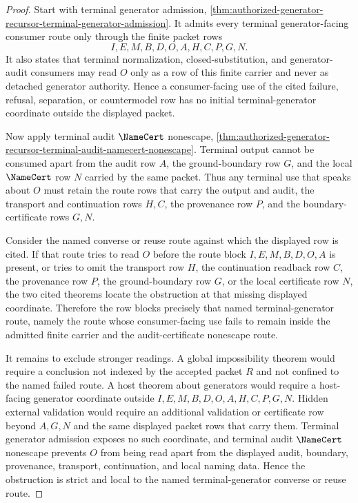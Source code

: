 \begin{proof}
Start with terminal generator admission, \autoref{thm:authorized-generator-recursor-terminal-generator-admission}. It admits every terminal generator-facing consumer route only through the finite packet rows
$$
I,E,M,B,D,O,A,H,C,P,G,N.
$$
It also states that terminal normalization, closed-substitution, and generator-audit consumers may read $O$ only as a row of this finite carrier and never as detached generator authority. Hence a consumer-facing use of the cited failure, refusal, separation, or countermodel row has no initial terminal-generator coordinate outside the displayed packet.

Now apply terminal audit $\NameCert$ nonescape, \autoref{thm:authorized-generator-recursor-terminal-audit-namecert-nonescape}. Terminal output cannot be consumed apart from the audit row $A$, the ground-boundary row $G$, and the local $\NameCert$ row $N$ carried by the same packet. Thus any terminal use that speaks about $O$ must retain the route rows that carry the output and audit, the transport and continuation rows $H,C$, the provenance row $P$, and the boundary-certificate rows $G,N$.

Consider the named converse or reuse route against which the displayed row is cited. If that route tries to read $O$ before the route block $I,E,M,B,D,O,A$ is present, or tries to omit the transport row $H$, the continuation readback row $C$, the provenance row $P$, the ground-boundary row $G$, or the local certificate row $N$, the two cited theorems locate the obstruction at that missing displayed coordinate. Therefore the row blocks precisely that named terminal-generator route, namely the route whose consumer-facing use fails to remain inside the admitted finite carrier and the audit-certificate nonescape route.

It remains to exclude stronger readings. A global impossibility theorem would require a conclusion not indexed by the accepted packet $R$ and not confined to the named failed route. A host theorem about generators would require a host-facing generator coordinate outside $I,E,M,B,D,O,A,H,C,P,G,N$. Hidden external validation would require an additional validation or certificate row beyond $A,G,N$ and the same displayed packet rows that carry them. Terminal generator admission exposes no such coordinate, and terminal audit $\NameCert$ nonescape prevents $O$ from being read apart from the displayed audit, boundary, provenance, transport, continuation, and local naming data. Hence the obstruction is strict and local to the named terminal-generator converse or reuse route.
\end{proof}
